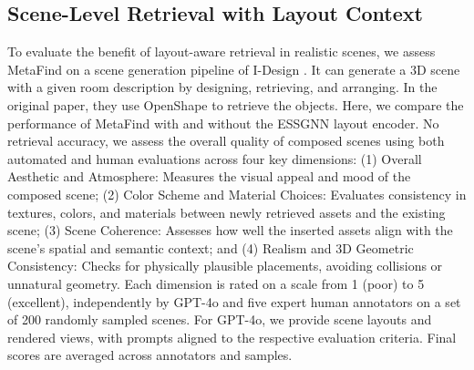 \subsection{Scene-Level Retrieval with Layout Context}
To evaluate the benefit of layout-aware retrieval in realistic scenes, we assess MetaFind on a scene generation pipeline of I-Design \cite{ccelen2024design}. It can generate a 3D scene with a given room description by designing, retrieving, and arranging.  In the original paper, they use OpenShape\cite{liu2023openshape} to retrieve the objects. Here, we compare the performance of MetaFind with and without the ESSGNN layout encoder. No retrieval accuracy, we assess the overall quality of composed scenes using both automated and human evaluations across four key dimensions: (1) Overall Aesthetic and Atmosphere: Measures the visual appeal and mood of the composed scene; (2) Color Scheme and Material Choices: Evaluates consistency in textures, colors, and materials between newly retrieved assets and the existing scene; (3) Scene Coherence: Assesses how well the inserted assets align with the scene's spatial and semantic context; and (4) Realism and 3D Geometric Consistency: Checks for physically plausible placements, avoiding collisions or unnatural geometry. Each dimension is rated on a scale from 1 (poor) to 5 (excellent), independently by GPT-4o and five expert human annotators on a set of 200 randomly sampled scenes. For GPT-4o, we provide scene layouts and rendered views, with prompts aligned to the respective evaluation criteria. Final scores are averaged across annotators and samples.

